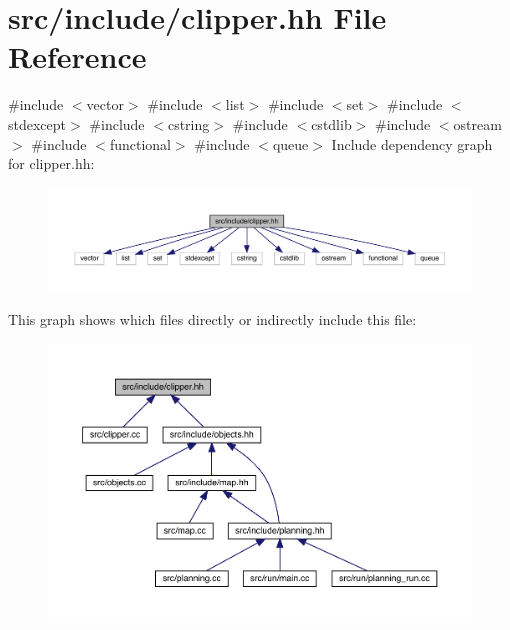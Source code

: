 \hypertarget{clipper_8hh}{}\section{src/include/clipper.hh File Reference}
\label{clipper_8hh}
{\ttfamily \#include $<$vector$>$}\newline
{\ttfamily \#include $<$list$>$}\newline
{\ttfamily \#include $<$set$>$}\newline
{\ttfamily \#include $<$stdexcept$>$}\newline
{\ttfamily \#include $<$cstring$>$}\newline
{\ttfamily \#include $<$cstdlib$>$}\newline
{\ttfamily \#include $<$ostream$>$}\newline
{\ttfamily \#include $<$functional$>$}\newline
{\ttfamily \#include $<$queue$>$}\newline
Include dependency graph for clipper.\+hh\+:
\nopagebreak
\begin{figure}[H]
\begin{center}
\leavevmode
\includegraphics[width=350pt]{clipper_8hh__incl}
\end{center}
\end{figure}
This graph shows which files directly or indirectly include this file\+:
\nopagebreak
\begin{figure}[H]
\begin{center}
\leavevmode
\includegraphics[width=350pt]{clipper_8hh__dep__incl}
\end{center}
\end{figure}
